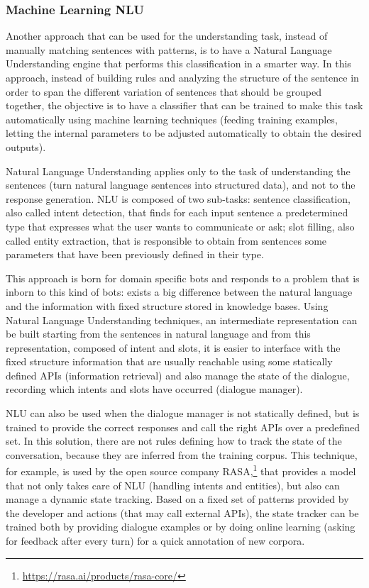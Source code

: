 \subsubsection{Machine Learning NLU}
\label{soaNLUIntro}

Another approach that can be used for the understanding task, instead of manually matching sentences with patterns, is to have a Natural Language Understanding engine that performs this classification in a smarter way. In this approach, instead of building rules and analyzing the structure of the sentence in order to span the different variation of sentences that should be grouped together, the objective is to have a classifier that can be trained to make this task automatically using machine learning techniques (feeding training examples, letting the internal parameters to be adjusted automatically to obtain the desired outputs).

Natural Language Understanding applies only to the task of understanding the sentences (turn natural language sentences into structured data), and not to the response generation. NLU is composed of two sub-tasks: sentence classification, also called intent detection, that finds for each input sentence a predetermined type that expresses what the user wants to communicate or ask; slot filling, also called entity extraction, that is responsible to obtain from sentences some parameters that have been previously defined in their type.

This approach is born for domain specific bots and responds to a problem that is inborn to this kind of bots: exists a big difference between the natural language and the information with fixed structure stored in knowledge bases. Using Natural Language Understanding techniques, an intermediate representation can be built starting from the sentences in natural language and from this representation, composed of intent and slots, it is easier to interface with the fixed structure information that are usually reachable using some statically defined APIs (information retrieval) and also manage the state of the dialogue, recording which intents and slots have occurred (dialogue manager).

NLU can also be used when the dialogue manager is not statically defined, but is trained to provide the correct responses and call the right APIs over a predefined set. In this solution, there are not rules defining how to track the state of the conversation, because they are inferred from the training corpus. This technique, for example, is used by the open source company RASA,\footnote{\url{https://rasa.ai/products/rasa-core/}} that provides a model that not only takes care of NLU (handling intents and entities), but also can manage a dynamic state tracking. Based on a fixed set of patterns provided by the developer and actions (that may call external APIs), the state tracker can be trained both by providing dialogue examples or by doing online learning (asking for feedback after every turn) for a quick annotation of new corpora.

